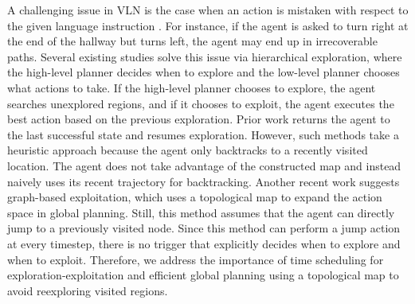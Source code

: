 \documentclass[10pt,twocolumn,letterpaper]{article}
\begin{document}
\font=2.0pt
A challenging issue in VLN is the case when an action is mistaken with respect to the given language instruction \cite{ma2019self, ma2019regretful, zhu2020vision, chen2022think, NEURIPS2020_evolving-graph, Wang_2021_CVPR-structured-scene}. For instance, if the agent is asked to turn right at the end of the hallway but turns left, the agent may end up in irrecoverable paths.
Several existing studies solve this issue via hierarchical exploration, where the high-level planner decides when to explore and the low-level planner chooses what actions to take. If the high-level planner chooses to explore, the agent searches unexplored regions, and if it chooses to exploit, the agent executes the best action based on the previous exploration.
Prior work \cite{ma2019self, ma2019regretful, zhu2020vision} returns the agent to the last successful state and resumes exploration.
However, such methods take a heuristic approach because the agent only backtracks to a recently visited location. The agent does not take advantage of the constructed map and instead naively uses its recent trajectory for backtracking. Another recent work \cite{Wang_2021_CVPR-structured-scene} suggests graph-based exploitation, which uses a topological map to expand the action space in global planning. Still, this method assumes that the agent can directly jump to a previously visited node. Since this method can perform a jump action at every timestep, there is no trigger that explicitly decides when to explore and when to exploit. Therefore, we address the importance of time scheduling for exploration-exploitation and efficient global planning using a topological map to avoid reexploring visited regions.
\end{document}
